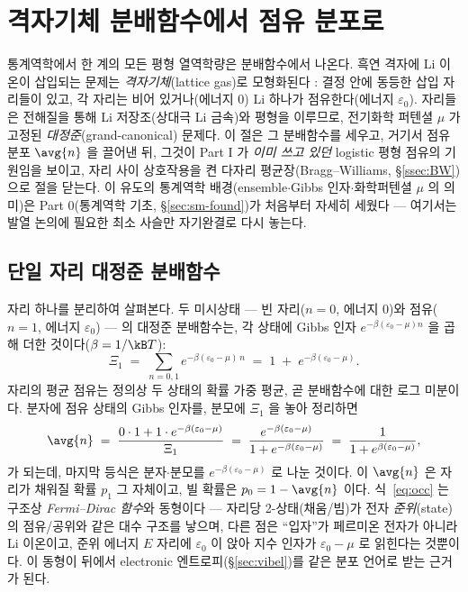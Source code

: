 \section{격자기체 분배함수에서 점유 분포로}\label{sec:partition}

통계역학에서 한 계의 모든 평형 열역학량은 분배함수에서 나온다. 흑연 격자에 Li 이온이 삽입되는 문제는
\emph{격자기체}(lattice gas)로 모형화된다 \cite{newman,huggins2009}: 결정 안에 동등한 삽입 자리들이 있고,
각 자리는 비어 있거나(에너지 $0$) Li 하나가 점유한다(에너지 $\varepsilon_0$). 자리들은 전해질을 통해 Li
저장조(상대극 Li 금속)와 평형을 이루므로, 전기화학 퍼텐셜 $\mu$ 가 고정된 \emph{대정준}(grand-canonical)
문제다. 이 절은 그 분배함수를 세우고, 거기서 점유 분포 $\avg{n}$ 을 끌어낸 뒤, 그것이 Part I 가 \emph{이미
쓰고 있던} logistic 평형 점유의 기원임을 보이고, 자리 사이 상호작용을 켠 다자리 평균장(Bragg--Williams,
\S\ref{ssec:BW})으로 절을 닫는다. 이 유도의 통계역학 배경(ensemble$\cdot$Gibbs 인자$\cdot$화학퍼텐셜 $\mu$ 의
의미)은 Part 0(통계역학 기초, \S\ref{sec:sm-found})가 처음부터 자세히 세웠다 --- 여기서는 발열 논의에 필요한 최소
사슬만 자기완결로 다시 놓는다.

\subsection{단일 자리 대정준 분배함수}\label{ssec:site}
자리 하나를 분리하여 살펴본다. 두 미시상태 --- 빈 자리($n=0$, 에너지 $0$)와 점유($n=1$, 에너지
$\varepsilon_0$) --- 의 대정준 분배함수는, 각 상태에 Gibbs 인자 $e^{-\beta(\varepsilon_0-\mu)n}$ 을 곱해 더한
것이다($\beta=1/\kB T$):
\begin{equation}
\Xi_1 \;=\; \sum_{n=0,1} e^{-\beta(\varepsilon_0-\mu)\,n}
\;=\; 1 \;+\; e^{-\beta(\varepsilon_0-\mu)}.
\label{eq:Z1}
\end{equation}
자리의 평균 점유는 정의상 두 상태의 확률 가중 평균, 곧 분배함수에 대한 로그 미분이다. 분자에 점유 상태의
Gibbs 인자를, 분모에 $\Xi_1$ 을 놓아 정리하면
\begin{equation}
\avg{n} \;=\; \frac{0\cdot 1 + 1\cdot e^{-\beta(\varepsilon_0-\mu)}}{\Xi_1}
\;=\; \frac{e^{-\beta(\varepsilon_0-\mu)}}{1+e^{-\beta(\varepsilon_0-\mu)}}
\;=\; \frac{1}{1+e^{\beta(\varepsilon_0-\mu)}},
\label{eq:occ}
\end{equation}
가 되는데, 마지막 등식은 분자$\cdot$분모를 $e^{-\beta(\varepsilon_0-\mu)}$ 로 나눈 것이다. 이 $\avg{n}$ 은 자리가
채워질 확률 $p_1$ 그 자체이고, 빌 확률은 $p_0=1-\avg{n}$ 이다. 식~\eqref{eq:occ} 는 구조상 \emph{Fermi--Dirac
함수}와 동형이다 --- 자리당 2-상태(채움/빔)가 전자 \emph{준위}(state)의 점유/공위와 같은 대수 구조를 낳으며, 다른 점은
``입자''가 페르미온 전자가 아니라 Li 이온이고, 준위 에너지 $E$ 자리에 $\varepsilon_0$ 이 앉아 지수 인자가 $\varepsilon_0-\mu$ 로 읽힌다는 것뿐이다. 이 동형이
뒤에서 electronic 엔트로피(\S\ref{sec:vibel})를 같은 분포 언어로 받는 근거가 된다.


